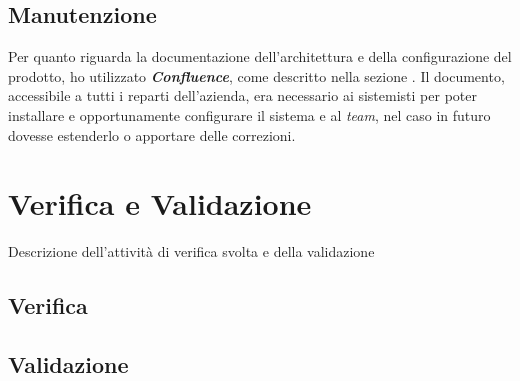 \subsection{Manutenzione}
Per quanto riguarda la documentazione dell'architettura e della configurazione del prodotto, ho utilizzato \textbf{\textit{Confluence}}, come descritto nella sezione . Il documento, accessibile a tutti i reparti dell'azienda, era necessario ai sistemisti per poter installare e opportunamente configurare il sistema e al \textit{team}, nel caso in futuro dovesse estenderlo o apportare delle correzioni.

\section{Verifica e Validazione}
Descrizione dell'attività di verifica svolta e della validazione
\subsection{Verifica}
\subsection{Validazione}
